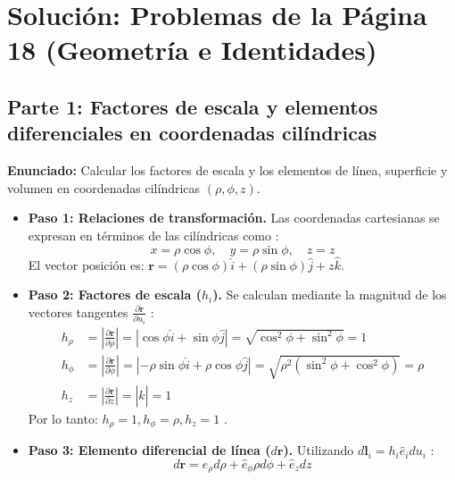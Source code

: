 \documentclass[a4paper]{article}
\begin{document}
\section*{Solución: Problemas de la Página 18 (Geometría e Identidades)}

\subsection*{Parte 1: Factores de escala y elementos diferenciales en coordenadas cilíndricas}
\textbf{Enunciado:} Calcular los factores de escala y los elementos de línea, superficie y volumen en coordenadas cilíndricas $(\rho, \phi, z)$.

\begin{itemize}
    \item \textbf{Paso 1: Relaciones de transformación.}
    Las coordenadas cartesianas se expresan en términos de las cilíndricas como \cite{34}:
    \begin{equation*}
        x = \rho \cos\phi, \quad y = \rho \sin\phi, \quad z = z
    \end{equation*}
    El vector posición es: $\mathbf{r} = (\rho \cos\phi)\hat{i} + (\rho \sin\phi)\hat{j} + z\hat{k}$.

    \item \textbf{Paso 2: Factores de escala ($h_i$).}
    Se calculan mediante la magnitud de los vectores tangentes $\frac{\partial \mathbf{r}}{\partial u_i}$ \cite{43}:
    \begin{align*}
        h_\rho &= \left| \frac{\partial \mathbf{r}}{\partial \rho} \right| = | \cos\phi \hat{i} + \sin\phi \hat{j} | = \sqrt{\cos^2\phi + \sin^2\phi} = 1 \\
        h_\phi &= \left| \frac{\partial \mathbf{r}}{\partial \phi} \right| = | -\rho \sin\phi \hat{i} + \rho \cos\phi \hat{j} | = \sqrt{\rho^2(\sin^2\phi + \cos^2\phi)} = \rho \\
        h_z &= \left| \frac{\partial \mathbf{r}}{\partial z} \right| = | \hat{k} | = 1
    \end{align*}
    Por lo tanto: $h_\rho = 1, h_\phi = \rho, h_z = 1$ \cite{73}.

    \item \textbf{Paso 3: Elemento diferencial de línea ($d\mathbf{r}$).}
    Utilizando $d\mathbf{l}_i = h_i \hat{e}_i du_i$ \cite{69}:
    \begin{equation*}
        d\mathbf{r} = \hat{e}_\rho d\rho + \hat{e}_\phi \rho d\phi + \hat{e}_z dz
    \end{equation*}


\end{itemize}
\end{document}
